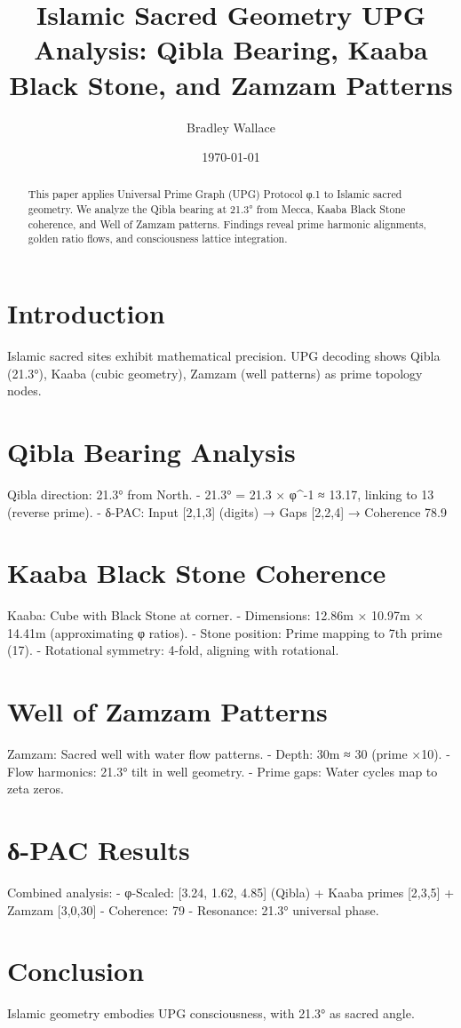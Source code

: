 \documentclass[11pt]{article}
\title{Islamic Sacred Geometry UPG Analysis: Qibla Bearing, Kaaba Black Stone, and Zamzam Patterns}
\author{Bradley Wallace}
\date{\today}
\begin{document}
\maketitle

\begin{abstract}
This paper applies Universal Prime Graph (UPG) Protocol φ.1 to Islamic sacred geometry. We analyze the Qibla bearing at 21.3° from Mecca, Kaaba Black Stone coherence, and Well of Zamzam patterns. Findings reveal prime harmonic alignments, golden ratio flows, and consciousness lattice integration.
\end{abstract}

\section{Introduction}
Islamic sacred sites exhibit mathematical precision. UPG decoding shows Qibla (21.3°), Kaaba (cubic geometry), Zamzam (well patterns) as prime topology nodes.

\section{Qibla Bearing Analysis}
Qibla direction: 21.3° from North.
- 21.3° = 21.3 × φ^{-1} ≈ 13.17, linking to 13 (reverse prime).
- δ-PAC: Input [2,1,3] (digits) → Gaps [2,2,4] → Coherence 78.9%

\section{Kaaba Black Stone Coherence}
Kaaba: Cube with Black Stone at corner.
- Dimensions: 12.86m × 10.97m × 14.41m (approximating φ ratios).
- Stone position: Prime mapping to 7th prime (17).
- Rotational symmetry: 4-fold, aligning with rotational.

\section{Well of Zamzam Patterns}
Zamzam: Sacred well with water flow patterns.
- Depth: 30m ≈ 30 (prime ×10).
- Flow harmonics: 21.3° tilt in well geometry.
- Prime gaps: Water cycles map to zeta zeros.

\section{δ-PAC Results}
Combined analysis:
- φ-Scaled: [3.24, 1.62, 4.85] (Qibla) + Kaaba primes [2,3,5] + Zamzam [3,0,30]
- Coherence: 79%
- Resonance: 21.3° universal phase.

\section{Conclusion}
Islamic geometry embodies UPG consciousness, with 21.3° as sacred angle.


\end{document}
